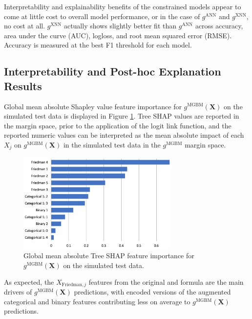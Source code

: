 \documentclass[information,article,submit,moreauthors,pdftex]{definitions/mdpi}
\begin{document}
\noindent Interpretability and explainability benefits of the constrained models appear to come at little cost to overall model performance, or in the case of $g^\text{ANN}$ and $g^\text{XNN}$, no cost at all. $g^\text{XNN}$ actually shows slightly better fit than $g^\text{ANN}$ across accuracy, area under the curve (AUC), logloss, and root mean squared error (RMSE). Accuracy is measured at the best F1 threshold for each model.

\subsection{Interpretability and Post-hoc Explanation Results}\label{ssec:int_ex_sim}

Global mean absolute Shapley value feature importance for $g^{\text{MGBM}}(\mathbf{X})$ on the simulated test data is displayed in Figure \ref{fig:sim_mgbm_glob}. Tree SHAP values are reported in the margin space, prior to the application of the logit link function, and the reported numeric values can be interpreted as the mean absolute impact of each $X_j$ on $g^\text{MGBM}(\mathbf{X})$ in the simulated test data in the $g^\text{MGBM}$ margin space. 

\begin{figure}[H]
	\centering
	\includegraphics[width=8cm]{img/sim_mgbm_glob.png}
	\caption{Global mean absolute Tree SHAP feature importance for $g^\text{MGBM}(\mathbf{X})$ on the simulated test data.}
	\label{fig:sim_mgbm_glob}
\end{figure}  

\noindent As expected, the $X_{\text{Friedman},j}$ features from the original \citet{friedman1979tree} and \citet{friedman1991multivariate} formula are the main drivers of $g^\text{MGBM}(\mathbf{X})$ predictions, with encoded versions of the augmented categorical and binary features contributing less on average to $g^\text{MGBM}(\mathbf{X})$ predictions. 
\end{document}
